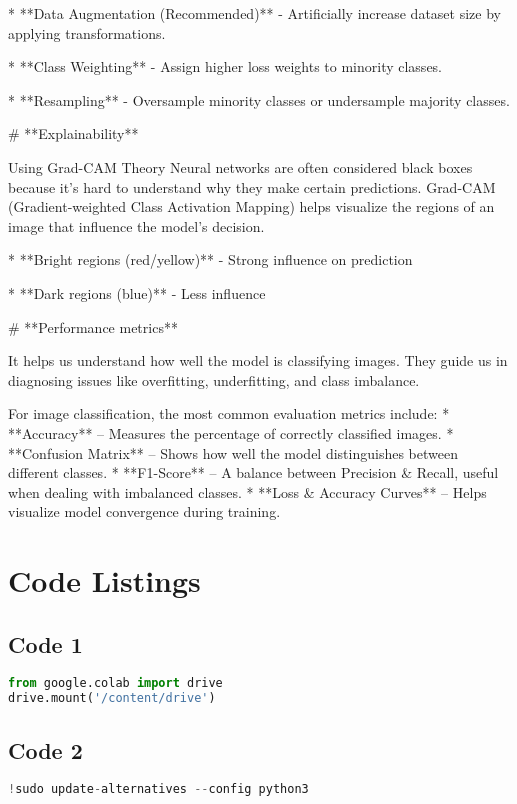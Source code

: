 \documentclass{article}
\begin{document}
*  **Data Augmentation (Recommended)** - Artificially increase dataset size by applying transformations.

*  **Class Weighting** - Assign higher loss weights to minority classes.

*  **Resampling** - Oversample minority classes or undersample majority classes.

# **Explainability**

 Using Grad-CAM Theory Neural networks are often considered black boxes because it's hard to understand why they make certain predictions. Grad-CAM (Gradient-weighted Class Activation Mapping) helps visualize the regions of an image that influence the model’s decision.

* **Bright regions (red/yellow)** - Strong influence on prediction

* **Dark regions (blue)** - Less influence

# **Performance metrics**

It helps us understand how well the model is classifying images. They guide us in diagnosing issues like overfitting, underfitting, and class imbalance.

For image classification, the most common evaluation metrics include:
*  **Accuracy** – Measures the percentage of correctly classified images.
* **Confusion Matrix** – Shows how well the model distinguishes between different classes.
* **F1-Score** – A balance between Precision & Recall, useful when dealing with imbalanced classes.
* **Loss & Accuracy Curves** – Helps visualize model convergence during training.

\section{Code Listings}
\subsection*{Code 1}
\begin{lstlisting}[language=Python]
from google.colab import drive
drive.mount('/content/drive')
\end{lstlisting}

\subsection*{Code 2}
\begin{lstlisting}[language=Python]
!sudo update-alternatives --config python3

\end{lstlisting}
\end{document}
